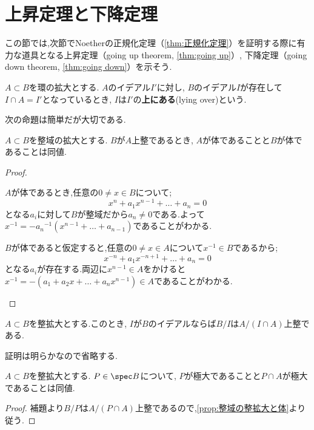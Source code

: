 \section{上昇定理と下降定理}
この節では,次節でNoetherの正規化定理（\ref{thm:正規化定理}）を証明する際に有力な道具となる上昇定理（going up theorem, \ref{thm:going up}）, 下降定理（going down theorem, \ref{thm:going down}）を示そう.

\begin{defi}
	$A\subset B$を環の拡大とする. $A$のイデアル$I'$に対し, $B$のイデアル$I$が存在して$I\cap A=I'$となっているとき, $I$は$I'$の\textbf{上にある}(lying over)という.
\end{defi}

次の命題は簡単だが大切である.
\begin{prop}\label{prop:整域の整拡大と体}
	$A\subset B$を整域の拡大とする. $B$が$A$上整であるとき, $A$が体であることと$B$が体であることは同値.
\end{prop}

\begin{proof}
	\begin{eqv}
		\item $A$が体であるとき,任意の$0\neq x\in B$について;
		\[x^n+a_1x^{n-1}+\dots+a_n=0\]
		となる$a_i$に対して$B$が整域だから$a_n\neq0$である.よって$x^{-1}=-{a_n}^{-1}(x^{n-1}+\dots+a_{n-1})$であることがわかる.
		
		\item $B$が体であると仮定すると,任意の$0\neq x\in A$について$x^{-1}\in B$であるから;
		\[x^{-n}+a_1x^{-n+1}+\dots+a_n=0\]
		となる$a_i$が存在する.両辺に$x^{n-1}\in A$をかけると$x^{-1}=-(a_1+a_2x+\dots+a_nx^{n-1})\in A$であることがわかる.
	\end{eqv}
\end{proof}

\begin{lem}\label{lem:整従属は剰余環に落ちる}
	$A\subset B$を整拡大とする.このとき, $I$が$B$のイデアルならば$B/I$は$A/(I\cap A)$上整である.
\end{lem}

証明は明らかなので省略する.

\begin{prop}\label{prop:簡略版lying over theorem}
	$A\subset B$を整拡大とする. $P\in\spec B$について, $P$が極大であることと$P\cap A$が極大であることは同値.
\end{prop}

\begin{proof}
	補題より$B/P$は$A/(P\cap A)$上整であるので,\ref{prop:整域の整拡大と体}より従う.
\end{proof}

